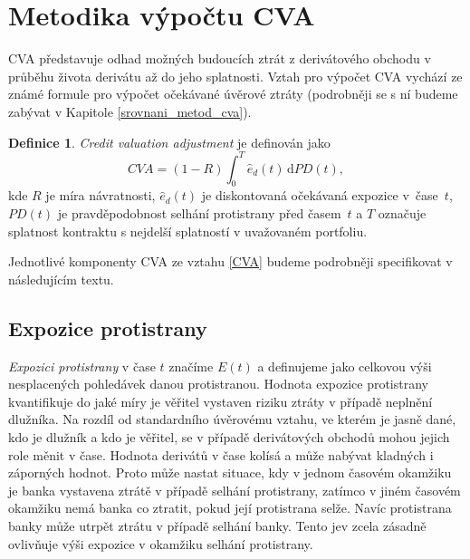 \documentclass[a4paper,12pt]{report}
\theoremstyle{definition} \newtheorem{definice}[veta]{Definice}
\theoremstyle{remark}
\begin{document}
\section{Metodika výpočtu CVA} \label{metodyCVA}
CVA představuje odhad možných budoucích ztrát z derivátového obchodu v průběhu života derivátu až do jeho splatnosti.
Vztah pro výpočet CVA vychází ze známé formule pro výpočet očekávané úvěrové ztráty (podrobněji se s ní budeme zabývat v Kapitole \ref{srovnani_metod_cva}).
\begin{definice}\label{cva_def}
 \textit{Credit valuation adjustment} je definován jako
 \begin{equation} \label{CVA}
 CVA=(1-R)\int_{0}^T \hat{e}_d(t)\,\mathrm{d} PD(t),
\end{equation}
 kde $R$ je míra návratnosti, $\hat{e}_d(t)$ je diskontovaná očekávaná expozice v~čase~$t$, $PD(t)$ je pravděpodobnost selhání protistrany před časem~$t$
a $T$ označuje splatnost kontraktu s nejdelší splatností v uvažovaném portfoliu. 
\end{definice}
Jednotlivé komponenty CVA ze vztahu \eqref{CVA} budeme podrobněji specifikovat v následujícím textu.

\subsection{Expozice protistrany}\label{exposure_kap}
\textit{Expozici protistrany} v čase $t$ značíme $E(t)$ a definujeme jako celkovou výši nesplacených pohledávek danou protistranou.
Hodnota expozice protistrany kvantifikuje do jaké míry je věřitel vystaven riziku ztráty v případě neplnění dlužníka.
Na rozdíl od standardního úvěrovému vztahu, ve kterém je jasně dané, kdo je dlužník a kdo je věřitel, se v případě derivátových obchodů mohou jejich role měnit v čase.
Hodnota derivátů v čase kolísá a může nabývat kladných i záporných hodnot.
Proto může nastat situace, kdy v jednom časovém okamžiku je banka vystavena ztrátě v případě selhání protistrany, zatímco v jiném časovém okamžiku nemá banka co ztratit, pokud její protistrana selže.
Navíc protistrana banky může utrpět ztrátu v případě selhání banky.
Tento jev zcela zásadně ovlivňuje výši expozice v okamžiku selhání protistrany.
\end{document}
